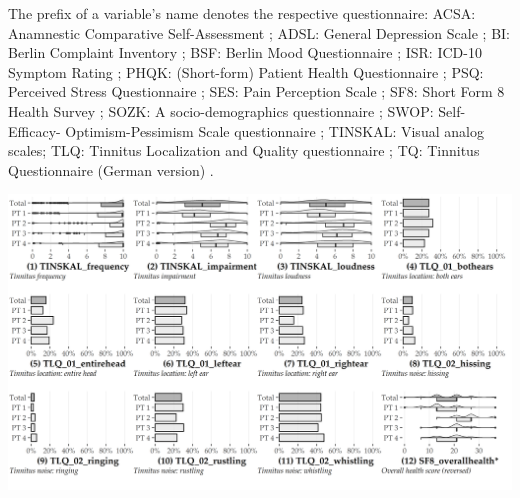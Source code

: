 \documentclass[
  oneside]{book}
\begin{document}
The prefix of a variable's name denotes the respective questionnaire:
ACSA: Anamnestic Comparative Self-Assessment \autocite{Bernheim:ACSA1993};
ADSL: General Depression Scale \autocite{Radloff:adsl1977,Hautzinger:ADSL2003};
BI: Berlin Complaint Inventory \autocite{Horhold:BI1997};
BSF: Berlin Mood Questionnaire \autocite{Horhold:BSF1993};
ISR: ICD-10 Symptom Rating \autocite{Tritt:ICD2008};
PHQK: (Short-form) Patient Health Questionnaire \autocite{Spitzer:PHQK1999};
PSQ: Perceived Stress Questionnaire \autocite{Fliege:PSQ2005};
SES: Pain Perception Scale \autocite{Geissner:SES1996};
SF8: Short Form 8 Health Survey \autocite{Bullinger:SF2008};
SOZK: A socio-demographics questionnaire \autocite{brueggemann:sozk-reference};
SWOP: Self-Efficacy- Optimism-Pessimism Scale questionnaire \autocite{Scholler:SWOP1999};
TINSKAL: Visual analog scales;
TLQ: Tinnitus Localization and Quality questionnaire \autocite{Goebel:TLQ1992};
TQ: Tinnitus Questionnaire (German version) \autocite{GoebelHiller:TF1998}.

\begin{center}\includegraphics[width=1\linewidth]{figures/93-p1} \end{center}
\end{document}
